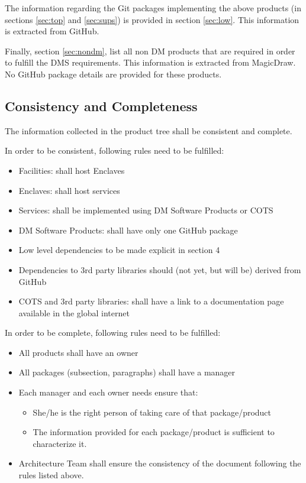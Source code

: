 The information regarding the Git packages implementing the above products (in sections \ref{sec:top} and \ref{sec:sups}) is provided in section \ref{sec:low}. 
This information is extracted from GitHub.

Finally, section \ref{sec:nondm}, list all non DM products that are required in order to fulfill the DMS requirements.
This information is extracted from MagicDraw.
No GitHub package details are provided for these products. 


\subsection{Consistency and Completeness}\label{sec:cons-comp}

The information collected in the product tree shall be consistent and complete.

In order to be consistent, following rules need to be fulfilled:

\begin{itemize}
\item Facilities: shall host Enclaves
\item Enclaves: shall host services
\item Services: shall be implemented using DM Software Products or COTS
\item DM Software Products: shall have only one GitHub package
\item Low level dependencies to be made explicit in section 4
\item Dependencies to 3rd party libraries should (not yet, but will be) derived from GitHub
\item COTS and 3rd party libraries: shall have a link to a documentation page available in the global internet
\end{itemize}

In order to be complete, following rules need to be fulfilled:

\begin{itemize}
\item All products shall have an owner
\item All packages (subsection, paragraphs) shall have a manager
\item Each manager and each owner needs ensure that:
\begin{itemize}
\item She/he is the right person of taking care of that package/product
\item The information provided for each package/product is sufficient to characterize it.
\end{itemize}
\item Architecture Team shall ensure the consistency of the document following the rules listed above.
\end{itemize}


